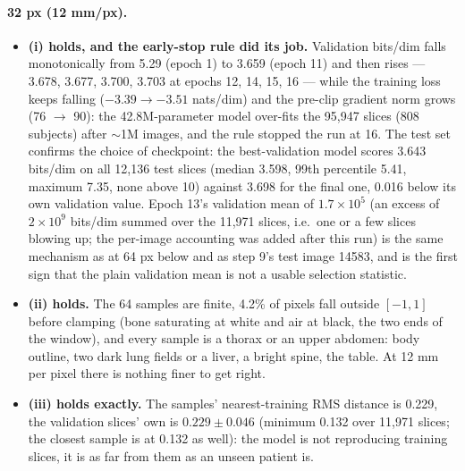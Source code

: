 \documentclass[11pt]{article}
\begin{document}
\paragraph{32 px (12 mm/px).}
\begin{itemize}
  \item \textbf{(i) holds, and the early-stop rule did its job.}
        Validation bits/dim falls monotonically from 5.29 (epoch 1) to
        3.659 (epoch 11) and then rises --- 3.678, 3.677, 3.700, 3.703 at
        epochs 12, 14, 15, 16 --- while the training loss keeps falling
        ($-3.39 \to -3.51$ nats/dim) and the pre-clip gradient norm grows
        (76 $\to$ 90): the 42.8M-parameter model over-fits the 95,947
        slices (808 subjects) after $\sim$1M images, and the rule stopped
        the run at 16. The test set confirms the choice of checkpoint: the
        best-validation model scores 3.643 bits/dim on all 12,136 test
        slices (median 3.598, 99th percentile 5.41, maximum 7.35, none above
        10) against 3.698 for the final one, 0.016 below its own
        validation value. Epoch 13's validation mean of $1.7 \times 10^{5}$
        (an excess of $2 \times 10^{9}$ bits/dim summed over the 11,971
        slices, i.e.\ one or a few slices blowing up; the per-image
        accounting was added after this run) is the same mechanism as at
        64 px below and as step 9's test image 14583, and is the first
        sign that the plain validation mean is not a usable selection
        statistic.
  \item \textbf{(ii) holds.} The 64 samples are finite, 4.2\% of pixels
        fall outside $[-1,1]$ before clamping (bone saturating at white and
        air at black, the two ends of the window), and every sample is a
        thorax or an upper abdomen: body outline, two dark lung fields or a
        liver, a bright spine, the table. At 12 mm per pixel there is
        nothing finer to get right.
  \item \textbf{(iii) holds exactly.} The samples' nearest-training RMS
        distance is 0.229, the validation slices' own is $0.229 \pm 0.046$
        (minimum 0.132 over 11,971 slices; the closest sample is at 0.132
        as well): the model is not reproducing training slices, it is as
        far from them as an unseen patient is.
\end{itemize}
\end{document}

